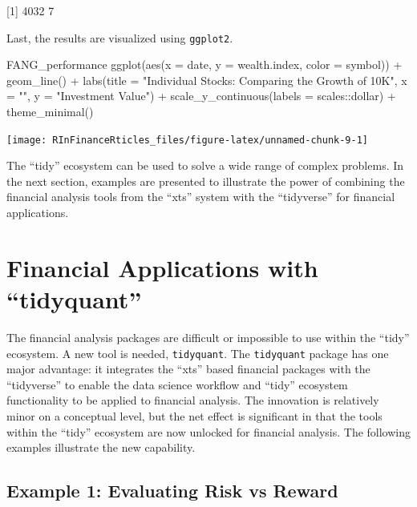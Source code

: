 {[}1{]} 4032 7

\hspace{20 mm}

Last, the results are visualized using \texttt{ggplot2}.

\begin{Schunk}
\begin{Sinput}
FANG_performance %
    ggplot(aes(x = date, y = wealth.index, color = symbol)) +
    geom_line() +
    labs(title = "Individual Stocks: Comparing the Growth of 10K",
         x = "", y = "Investment Value") +
    scale_y_continuous(labels = scales::dollar) + 
    theme_minimal()
\end{Sinput}


\begin{center}\texttt{[image: RInFinanceRticles\_files/figure-latex/unnamed-chunk-9-1]} \end{center}

\end{Schunk}

The ``tidy'' ecosystem can be used to solve a wide range of complex
problems. In the next section, examples are presented to illustrate the
power of combining the financial analysis tools from the ``xts'' system
with the ``tidyverse'' for financial applications.

\section{\texorpdfstring{Financial Applications with
``tidyquant''}{Financial Applications with tidyquant}}\label{financial-applications-with-tidyquant}

The financial analysis packages are difficult or impossible to use
within the ``tidy'' ecosystem. A new tool is needed, \texttt{tidyquant}.
The \texttt{tidyquant} package has one major advantage: it integrates
the ``xts'' based financial packages with the ``tidyverse'' to enable
the data science workflow and ``tidy'' ecosystem functionality to be
applied to financial analysis. The innovation is relatively minor on a
conceptual level, but the net effect is significant in that the tools
within the ``tidy'' ecosystem are now unlocked for financial analysis.
The following examples illustrate the new capability.

\subsection{Example 1: Evaluating Risk vs
Reward}\label{example-1-evaluating-risk-vs-reward}

